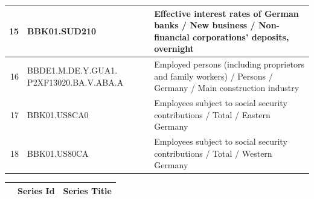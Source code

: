 \documentclass[12pt]{article}
\begin{document}
\begin{table}[ht]
\begin{tabular}{rp{5cm}p{11cm}}
  \hline
  15 & BBK01.SUD210 & Effective interest rates of German banks / New business / Non-financial corporations' deposits, overnight \\ 
  \hline
  16 & BBDE1.M.DE.Y.GUA1. P2XF13020.BA.V.ABA.A & Employed persons (including proprietors and family workers) / Persons / Germany / Main construction industry \\ 
  \hline
  17 & BBK01.US8CA0 & Employees subject to social security contributions / Total / Eastern Germany \\ 
  \hline
  18 & BBK01.US80CA & Employees subject to social security contributions / Total / Western Germany \\ 
\end{tabular}
\end{table}

\begin{table}
\centering
\begin{tabular}{rp{5cm}p{11cm}}
  & \textbf{Series Id} & \textbf{Series Title} \\
  \hline
  \hline


\end{tabular}
\end{table}
\end{document}
